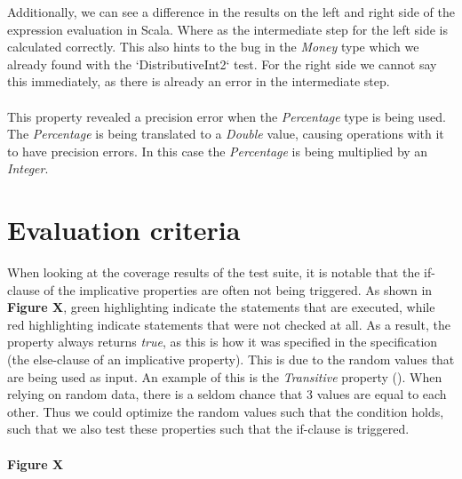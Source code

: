 \FloatBarrier
Additionally, we can see a difference in the results on the left and right side of the expression evaluation in Scala. Where as the intermediate step for the left side is calculated correctly. This also hints to the bug in the \textit{Money} type which we already found with the `DistributiveInt2` test. For the right side we cannot say this immediately, as there is already an error in the intermediate step.\\
\\
This property revealed a precision error when the \textit{Percentage} type is being used. The \textit{Percentage} is being translated to a \textit{Double} value, causing operations with it to have precision errors. In this case the \textit{Percentage} is being multiplied by an \textit{Integer}.

\section{Evaluation criteria}

When looking at the coverage results of the test suite, it is notable that the if-clause of the implicative properties are often not being triggered. As shown in \textbf{Figure X}, green highlighting indicate the statements that are executed, while red highlighting indicate statements that were not checked at all. As a result, the property always returns \textit{true}, as this is how it was specified in the specification (the else-clause of an implicative property). This is due to the random values that are being used as input. An example of this is the \textit{Transitive} property (). When relying on random data, there is a seldom chance that 3 values are equal to each other. Thus we could optimize the random values such that the condition holds, such that we also test these properties such that the if-clause is triggered.\\
\\
\textbf{Figure X}

